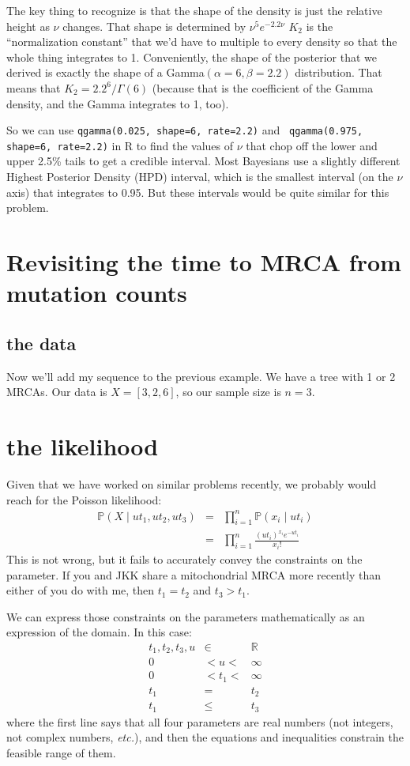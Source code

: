 \documentclass[11pt]{article}
\renewcommand{\Pr}{\mathbb{P}}
\begin{document}
The key thing to recognize is that the shape of the density is just
    the relative height as $\nu$ changes.
That shape is determined by $\nu^{5}e^{-2.2\nu}$
$K_2$ is the ``normalization constant'' that we'd have to multiple to 
    every density so that the whole thing integrates to 1.
Conveniently, the shape of the posterior that we derived is 
    exactly the shape of a Gamma$(\alpha=6, \beta=2.2)$ distribution.
That means that $K_2=2.2^6/\Gamma(6)$ (because that is the coefficient
of the Gamma density, and the Gamma integrates to 1, too).

So we can use {\tt qgamma(0.025, shape=6, rate=2.2)} and {\tt
qgamma(0.975, shape=6, rate=2.2)}
in R to find the values of $\nu$ that chop off the lower 
and upper 2.5\% tails to get a
credible interval.
Most Bayesians use a slightly different Highest Posterior Density (HPD)
interval, which is the smallest interval (on the $\nu$ axis) that integrates
to 0.95.
But these intervals would be quite similar for this problem.


\section{Revisiting the time to MRCA from mutation counts}
\subsection{the data}
Now we'll add my sequence to the previous example.
We have a tree with 1 or 2 MRCAs.
Our data is
$X=[3,2,6]$,
so our sample size is $n=3$.

\section{the likelihood}
Given that we have worked on similar problems recently, we probably would reach
for the Poisson likelihood:
\begin{eqnarray}
\Pr(X\mid ut_1, ut_2, ut_3)& = & \prod_{i=1}^{n} \Pr(x_i\mid ut_i)\\
& = & \prod_{i=1}^{n} \frac{(ut_i)^{x_i}e^{-ut_i}}{x_i ! }
\end{eqnarray}
This is not wrong, but it fails to accurately convey the constraints on the parameter.
If you and JKK share a mitochondrial MRCA more recently than either of you do with me, then $t_1=t_2$ and $t_3> t_1$.

We can express those constraints on the parameters mathematically as an expression of the domain.
In this case: 
\begin{eqnarray}
    t_1, t_2, t_3, u & \in &  \mathbb{R}\\
    0 & < u < & \infty\\
    0 & < t_1 < & \infty\\
    t_1 & = & t_2 \\
    t_1 & \leq & t_3
\end{eqnarray}
where the first line says that all four parameters are real numbers (not integers, 
not complex numbers, {\em etc.}), and then the equations and inequalities constrain
the feasible range of them.
\end{document}
